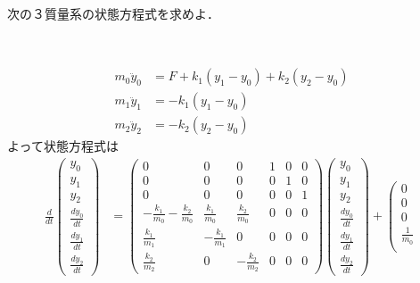 \documentclass[a4paper,11pt]{jreport}
\begin{document}
次の３質量系の状態方程式を求めよ．
\begin{figure}[htbp]
 \begin{center}
 \end{center}
\end{figure}
\begin{align}
	m_0 \ddot{y}_0 & = F + k_1 (y_1 - y_0) + k_2 (y_2-y_0)
\nonumber \\
	m_1 \ddot{y}_1 & = - k_1 (y_1 - y_0)
\nonumber \\
	m_2 \ddot{y}_2 & = - k_2 (y_2 - y_0)
\nonumber
\end{align}
よって状態方程式は
\begin{align}
 \frac{d}{dt} \left(\begin{array}{c}
	         y_0 \\
		     y_1 \\
		     y_2 \\
		     \frac{dy_0}{dt} \\
		     \frac{dy_1}{dt} \\
		     \frac{dy_2}{dt}
		    \end{array}\right)
 &=
 \left(\begin{array}{cccccc}
        0 & 0 & 0 & 1 & 0 & 0      \\
        0 & 0 & 0 & 0 & 1 & 0      \\
        0 & 0 & 0 & 0 & 0 & 1      \\
	-\frac{k_1}{m_0} -\frac{k_2}{m_0}&  \frac{k_1}{m_0} &  \frac{k_2}{m_0} & 0 & 0 & 0 \\
	 \frac{k_1}{m_1}                & -\frac{k_1}{m_1} &  0               & 0 & 0 & 0 \\
	 \frac{k_2}{m_2}                &  0               & -\frac{k_2}{m_2} & 0 & 0 & 0 
       \end{array}\right)
 \left(\begin{array}{c}
	         y_0 \\
		     y_1 \\
		     y_2 \\
		     \frac{dy_0}{dt} \\
		     \frac{dy_1}{dt} \\
		     \frac{dy_2}{dt}
       \end{array}\right)
 +
 \left(\begin{array}{c}
        0 \\
        0 \\
        0 \\
	    \frac{1}{m_0} \\

\end{array}
\end{align}
\end{document}
